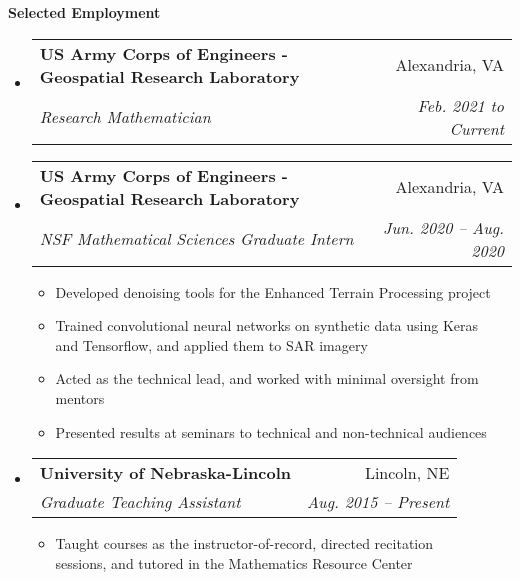 \documentclass[letterpaper,11pt]{article}
\makeatletter
\newcommand{\resitem}[1]{\item #1 \vspace{-2pt}}
\newcommand{\resheading}[1]{{\large \colorbox{mygrey}{\begin{minipage}{\textwidth}{\textbf{#1 \vphantom{p\^{E}}}}\end{minipage}}}}
\newcommand{\ressubheading}[4]{
\begin{tabular*}{6.5in}{l@{\extracolsep{\fill}}r}
		\textbf{#1} & #2 \\
		\textit{#3} & \textit{#4} \\
\end{tabular*}\vspace{-6pt}}
\makeatother
\begin{document}
\resheading{Selected Employment}
	\begin{itemize}
		\item
		\ressubheading{US Army Corps of Engineers - Geospatial Research Laboratory}{Alexandria, VA}{Research Mathematician}{Feb. 2021 to Current}
		
		\item
		\ressubheading{US Army Corps of Engineers - Geospatial Research Laboratory}{Alexandria, VA}{NSF Mathematical Sciences Graduate Intern}{Jun. 2020 -- Aug. 2020}
		{\footnotesize
			\begin{itemize}
				\resitem{Developed denoising tools for the Enhanced Terrain Processing project}
				\resitem{Trained convolutional neural networks on synthetic data using Keras \\ and Tensorflow, and applied them to SAR imagery}
				\resitem{Acted as the technical lead, and worked with minimal oversight from mentors}
				\resitem{Presented results at seminars to technical and non-technical audiences}
		\end{itemize}}

\newpage

		\item
			{\ressubheading{University of Nebraska-Lincoln}{Lincoln, NE}{Graduate Teaching Assistant}{Aug. 2015 -- Present}
				{ \footnotesize
				\begin{itemize}
					\resitem{Taught courses as the instructor-of-record, directed recitation \\ sessions, and tutored in the Mathematics Resource Center}
				\end{itemize}}}


\end{itemize}
\end{document}
